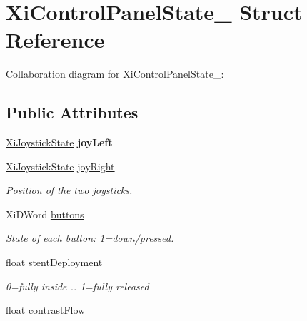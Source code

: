 \hypertarget{structXiControlPanelState__}{
\section{XiControlPanelState\_\- Struct Reference}
\label{structXiControlPanelState__}
}
Collaboration diagram for XiControlPanelState\_\-:\subsection*{Public Attributes}
\begin{DoxyCompactItemize}
\item 
\hypertarget{structXiControlPanelState___a8b7cfde5ce33f31fe77a474e9467b07b}{
\hyperlink{structXiJoystickState__}{XiJoystickState} {\bfseries joyLeft}}
\label{structXiControlPanelState___a8b7cfde5ce33f31fe77a474e9467b07b}

\item 
\hypertarget{structXiControlPanelState___af1d1326843a3c8bf284c5ed97bc1ef8c}{
\hyperlink{structXiJoystickState__}{XiJoystickState} \hyperlink{structXiControlPanelState___af1d1326843a3c8bf284c5ed97bc1ef8c}{joyRight}}
\label{structXiControlPanelState___af1d1326843a3c8bf284c5ed97bc1ef8c}

\begin{DoxyCompactList}\small\item\em Position of the two joysticks. \item\end{DoxyCompactList}\item 
\hypertarget{structXiControlPanelState___a621e7fef89e2eadef8bb51963ba8cbe1}{
XiDWord \hyperlink{structXiControlPanelState___a621e7fef89e2eadef8bb51963ba8cbe1}{buttons}}
\label{structXiControlPanelState___a621e7fef89e2eadef8bb51963ba8cbe1}

\begin{DoxyCompactList}\small\item\em State of each button: 1=down/pressed. \item\end{DoxyCompactList}\item 
\hypertarget{structXiControlPanelState___a75171916cba8c1f69d74dff1e25b8d4a}{
float \hyperlink{structXiControlPanelState___a75171916cba8c1f69d74dff1e25b8d4a}{stentDeployment}}
\label{structXiControlPanelState___a75171916cba8c1f69d74dff1e25b8d4a}

\begin{DoxyCompactList}\small\item\em 0=fully inside .. 1=fully released \item\end{DoxyCompactList}\item 
\hypertarget{structXiControlPanelState___a6ba7dd1fef0bc0d6467b25cd0338496f}{
float \hyperlink{structXiControlPanelState___a6ba7dd1fef0bc0d6467b25cd0338496f}{contrastFlow}}
\label{structXiControlPanelState___a6ba7dd1fef0bc0d6467b25cd0338496f}


\end{DoxyCompactItemize}
